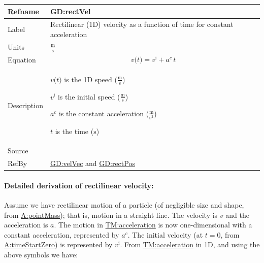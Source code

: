 \documentclass[12pt]{article}
\begin{document}
\medskip
\noindent
\begin{minipage}{\textwidth}
\begin{tabular}{>{\raggedright}p{}>{\raggedright\arraybackslash}p{}}
\toprule \textbf{Refname} & \textbf{GD:rectVel}
\label{GD:rectVel}
\\ \midrule
Label & Rectilinear (1D) velocity as a function of time for constant acceleration
        
\\ \midrule
Units & $\frac{\text{m}}{\text{s}}$
        
\\ \midrule
Equation & \begin{displaymath}
           v\text{(}t\text{)}={v^{\text{i}}}+{a^{c}}\,t
           \end{displaymath}
\\ \midrule
Description & \begin{symbDescription}
              \item{$v\text{(}t\text{)}$ is the 1D speed ($\frac{\text{m}}{\text{s}}$)}
              \item{${v^{\text{i}}}$ is the initial speed ($\frac{\text{m}}{\text{s}}$)}
              \item{${a^{c}}$ is the constant acceleration ($\frac{\text{m}}{\text{s}^{2}}$)}
              \item{$t$ is the time (${\text{s}}$)}
              \end{symbDescription}
\\ \midrule
Source & \cite[(pg. 8)]{hibbeler2004}
         
\\ \midrule
RefBy & \hyperref[GD:velVec]{GD:velVec} and \hyperref[GD:rectPos]{GD:rectPos}
        
\\ \bottomrule
\end{tabular}
\end{minipage}

\paragraph{Detailed derivation of rectilinear velocity:}
\label{GD:rectVelDeriv}
Assume we have rectilinear motion of a particle (of negligible size and shape, from \hyperref[pointMass]{A:pointMass}); that is, motion in a straight line. The velocity is $v$ and the acceleration is $a$. The motion in \hyperref[TM:acceleration]{TM:acceleration} is now one-dimensional with a constant acceleration, represented by ${a^{c}}$. The initial velocity (at $t=0$, from \hyperref[timeStartZero]{A:timeStartZero}) is represented by ${v^{\text{i}}}$. From \hyperref[TM:acceleration]{TM:acceleration} in 1D, and using the above symbols we have:
\end{document}
